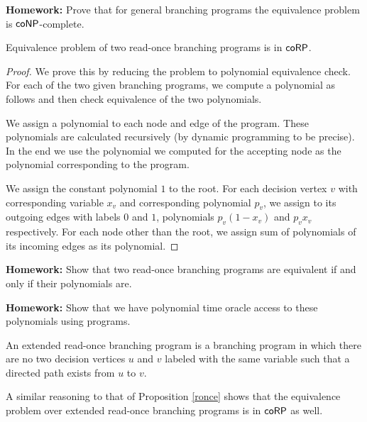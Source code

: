 \textbf{Homework:} Prove that for general branching programs the equivalence problem is $\mathsf{coNP}$-complete.

\begin{proposition}\label{ronce}
Equivalence problem of two read-once branching programs is in $\mathsf{coRP}$.
\end{proposition}
\begin{proof}
We prove this by reducing the problem to polynomial equivalence check. For each of the two given branching programs, we compute a polynomial as follows and then check equivalence of the two polynomials.

We assign a polynomial to each node and edge of the program. These polynomials are calculated recursively (by dynamic programming to be precise). In the end we use the polynomial we computed for the accepting node as the polynomial corresponding to the program.

We assign the constant polynomial $1$ to the root. For each decision vertex $v$ with corresponding variable $x_v$ and corresponding polynomial $p_v$, we assign to its outgoing edges with labels $0$ and $1$, polynomials $p_v(1-x_v)$ and $p_v x_v$ respectively. For each node other than the root, we assign sum of polynomials of its incoming edges as its polynomial.

\end{proof}

\textbf{Homework:} Show that two read-once branching programs are equivalent if and only if their polynomials are.

\textbf{Homework:} Show that we have polynomial time oracle access to these polynomials using programs.

\begin{definition} An extended read-once branching program is a branching program in which there are no two decision vertices $u$ and $v$ labeled with the same variable such that a directed path exists from $u$ to $v$.
\end{definition}

A similar reasoning to that of Proposition \ref{ronce} shows that the equivalence problem over extended read-once branching programs is in $\mathsf{coRP}$ as well.


